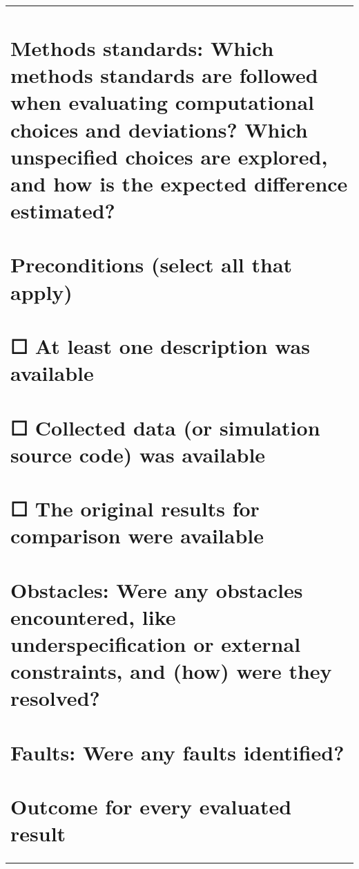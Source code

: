 \documentclass[authordate, empirical]{jote-new-article}
\begin{document}
\begin{table}
\begin{tabularx}{\linewidth}{@{} l @{}}
			\section{}



			\section{Methods standards: Which methods standards are followed when evaluating computational choices and deviations? Which unspecified choices are explored, and how is the expected difference estimated?}



			\section{Preconditions (select all that apply)}



			\section{☐ At least one description was available}



			\section{☐ Collected data (or simulation source code) was available}



			\section{☐ The original results for comparison were available}



			\section{Obstacles: Were any obstacles encountered, like underspecification or external constraints, and (how) were they resolved?}



			\section{Faults: Were any faults identified?}



			\section{Outcome for every evaluated result}




\end{tabularx}
\end{table}
\end{document}

